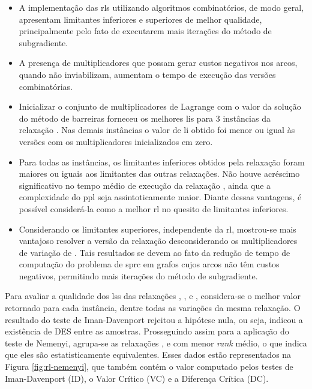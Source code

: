 \begin{itemize}
\item A implementação das \gls{rl}s utilizando algoritmos combinatórios, de modo
geral,  apresentam  limitantes  inferiores  e superiores  de  melhor  qualidade,
principalmente pelo fato de executarem mais iterações do método de subgradiente.
\item A presença de multiplicadores que possam gerar custos negativos nos arcos,
quando não inviabilizam, aumentam o tempo de execução das versões combinatórias.
\item  Inicializar o  conjunto de  multiplicadores de  Lagrange com  o valor  da
solução do método de barreiras forneceu  os melhores \gls{li}s para 3 instâncias
da relaxação {\rlq}. Nas demais instâncias  o valor de \gls{li} obtido foi menor
ou igual às versões com os multiplicadores inicializados em zero.
\item Para todas as instâncias,  os limitantes inferiores obtidos pela relaxação
{\rlq} foram maiores  ou iguais aos limitantes das outras  relaxações. Não houve
acréscimo significativo  no tempo médio  de execução da relaxação  {\rlq}, ainda
que  a complexidade  do  \gls{ppl} seja  assintoticamente  maior. Diante  dessas
vantagens,  é  possível  considerá-la  como  a melhor  \gls{rl}  no  quesito  de
limitantes inferiores.
\item  Considerando   os  limitantes   superiores,  independente   da  \gls{rl},
mostrou-se  mais vantajoso  resolver a  versão da  relaxação desconsiderando  os
multiplicadores de  variação de {\delay}.  Tais resultados  se devem ao  fato da
redução de tempo  de computação do problema de \gls{sprc}  em grafos cujos arcos
não têm custos negativos, permitindo mais iterações do método de subgradiente.
\end{itemize}

Para  avaliar a  qualidade dos  \gls{ls}s das  relaxações {\rlu,  \rld, \rlt}  e
{\rlq}, considera-se o melhor valor  retornado para cada instância, dentre todas
as variações da mesma relaxação. O resultado do teste de Iman-Davenport rejeitou
a  hipótese nula,  ou  seja, indicou  a  existência de  DES  entre as  amostras.
Prosseguindo assim para a aplicação do teste de Nemenyi, agrupa-se as relaxações
{\rld, \rlt}  e {\rlq} com  menor {\em  rank} médio, o  que indica que  eles são
estatisticamente  equivalentes.  Esses  dados   estão  representados  na  Figura
\ref{fig:rl-nemenyi},  que  também contém  o  valor  computado pelos  testes  de
Iman-Davenport (ID), o Valor Crítico (VC) e a Diferença Crítica (DC).

